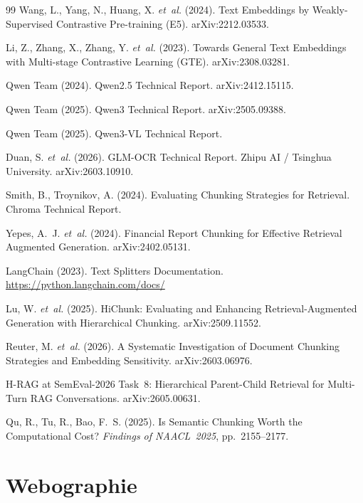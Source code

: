 \documentclass[11pt,a4paper]{article}
\begin{document}
\begin{thebibliography}{99}
Wang, L., Yang, N., Huang, X. \textit{et~al.} (2024).
Text Embeddings by Weakly-Supervised Contrastive Pre-training (E5).
arXiv:2212.03533.

Li, Z., Zhang, X., Zhang, Y. \textit{et~al.} (2023).
Towards General Text Embeddings with Multi-stage Contrastive Learning (GTE).
arXiv:2308.03281.

Qwen Team (2024). Qwen2.5 Technical Report. arXiv:2412.15115.

Qwen Team (2025). Qwen3 Technical Report. arXiv:2505.09388.

Qwen Team (2025). Qwen3-VL Technical Report.

Duan, S. \textit{et~al.} (2026).
GLM-OCR Technical Report. Zhipu AI / Tsinghua University.
arXiv:2603.10910.

Smith, B., Troynikov, A. (2024).
Evaluating Chunking Strategies for Retrieval.
Chroma Technical Report.

Yepes, A.~J. \textit{et~al.} (2024).
Financial Report Chunking for Effective Retrieval Augmented Generation.
arXiv:2402.05131.

LangChain (2023). Text Splitters Documentation.
\url{https://python.langchain.com/docs/}

Lu, W. \textit{et~al.} (2025).
HiChunk: Evaluating and Enhancing Retrieval-Augmented Generation with Hierarchical Chunking.
arXiv:2509.11552.

Reuter, M. \textit{et~al.} (2026).
A Systematic Investigation of Document Chunking Strategies and Embedding Sensitivity.
arXiv:2603.06976.

H-RAG at SemEval-2026 Task~8: Hierarchical Parent-Child Retrieval for Multi-Turn RAG Conversations.
arXiv:2605.00631.

Qu, R., Tu, R., Bao, F.~S. (2025).
Is Semantic Chunking Worth the Computational Cost?
\textit{Findings of NAACL~2025}, pp.~2155--2177.

\end{thebibliography}

\section*{Webographie}
\end{document}
